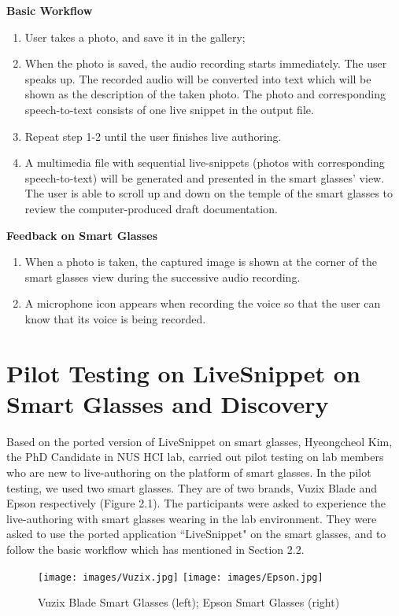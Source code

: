 \documentclass[fyp]{socreport}
\begin{document}
\textbf{Basic Workflow}
\begin{enumerate}
    \item User takes a photo, and save it in the gallery;
    \item When the photo is saved, the audio recording starts immediately. The user speaks up. The recorded audio will be converted into text which will be shown as the description of the taken photo. The photo and corresponding speech-to-text consists of one live snippet in the output file.
    \item Repeat step 1-2 until the user finishes live authoring.
    \item A multimedia file with sequential live-snippets (photos with corresponding speech-to-text) will be generated and presented in the smart glasses' view. The user is able to scroll up and down on the temple of the smart glasses to review the computer-produced draft documentation.
\end{enumerate}

\textbf{Feedback on Smart Glasses}
\begin{enumerate}
    \item When a photo is taken, the captured image is shown at the corner of the smart glasses view during the successive audio recording.
    \item A microphone icon appears when recording the voice so that  the user can know that its voice is being recorded.
\end{enumerate} 

\section{Pilot Testing on LiveSnippet on Smart Glasses and Discovery}
Based on the ported version of LiveSnippet on smart glasses, Hyeongcheol Kim, the PhD Candidate in NUS HCI lab, carried out pilot testing on lab members who are new to live-authoring on the platform of smart glasses. In the pilot testing, we used two smart glasses. They are of two brands, Vuzix Blade and Epson respectively (Figure 2.1). The participants were asked to experience the live-authoring with smart glasses wearing in the lab environment. They were asked to use the ported application ``LiveSnippet" on the smart glasses, and to follow the basic workflow which has mentioned in Section 2.2.

\begin{figure}[H]
\caption{Vuzix Blade Smart Glasses (left); Epson Smart Glasses (right)}
\centering
\texttt{[image: images/Vuzix.jpg]}
\quad\texttt{[image: images/Epson.jpg]}
\end{figure}
\end{document}
